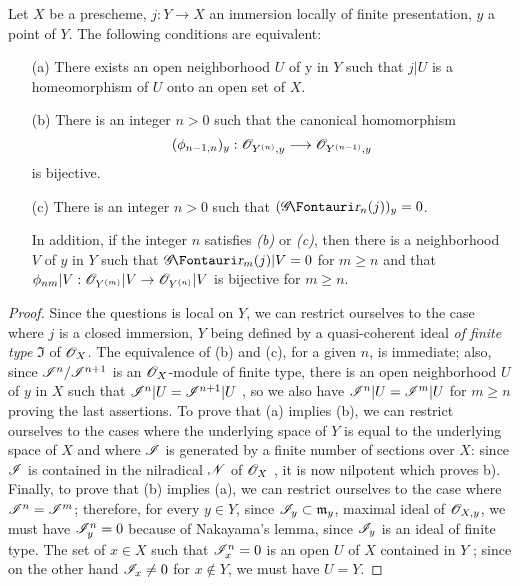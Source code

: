\begin{proposition}[16.1.9]
\label{IV.16.1.9}
Let $X$ be a prescheme, $j: Y \to X$ an immersion locally of finite presentation, $y$ a point of $Y$. The following conditions are equivalent:
\begin{enumerate}
  \item[(a)] There exists an open neighborhood $U$ of y in $Y$ such that $j|U$ is a homeomorphism of $U$ onto an open set of $X$.
  \item[(b)] There is an integer $n>0$ such that the canonical homomorphism
  \[
    (\phi_{n-1,n})_y: \sh{O}_{Y^{(n)},y} \to \sh{O}_{Y^{(n-1)},y}
  \]
  is bijective.
  \item[(c)] There is an integer $n>0$ such that $(\shGr_n(j))_y = 0$.
  
  In addition, if the integer $n$ satisfies \emph{(b)} or \emph{(c)}, then there is a neighborhood $V$ of $y$ in $Y$ such that $\shGr_m(j)|V = 0$ for $m \geq n$ and that $\phi_{nm}|V: \sh{O}_{Y^{(m)}}|V \to \sh{O}_{Y^{(n)}}|V$ is bijective for $m \geq n$. 
\end{enumerate}
\end{proposition}

\begin{proof}
Since the questions is local on $Y$, we can restrict ourselves to the case where $j$ is a closed immersion, $Y$ being defined by a quasi-coherent ideal \emph{of finite type} $\mathfrak{I}$ of $\mathscr{O}_X$.
The equivalence of (b) and (c), for a given $n$, is immediate;
also, since $\mathscr{I}^n/\mathscr{I}^{n+1}$ is an $\mathscr{O}_X$-module of finite type, there is an open neighborhood $U$ of $y$ in $X$ such that $\mathscr{I}^n|U = \mathscr{I}^{n+1}|U$ , so we also have $\mathscr{I}^n|U = \mathscr{I}^m|U$ for $m \geq n$ proving the last assertions.
To prove that (a) implies (b), we can restrict ourselves to the cases where the underlying space of $Y$ is equal to the underlying space of $X$ and where $\mathscr{I}$ is generated by a finite number of sections over $X$:
since $\mathscr{I}$ is contained in the nilradical $\mathscr{N}$ of $\mathscr{O}_X$ , it is now nilpotent which proves b).
Finally, to prove that (b) implies (a), we can restrict ourselves to the case where $\mathscr{I}^n = \mathscr{I}^m$; 
therefore, for every $y \in Y$, since $\mathscr{I}_y \subset \mathfrak{m}_y$, maximal ideal of $\mathscr{O}_{X,y}$, we must have $\mathscr{I}^n_y = 0$ because of Nakayama's lemma, since $\mathscr{I}_y$ is an ideal of finite type.
The set of $x \in X$ such that $\mathscr{I}^n_x = 0$ is an open $U$ of $X$ contained in $Y$ ;
since on the other hand $\mathscr{I}_x \neq 0$ for $x \notin Y$, we must have $U = Y$.
\end{proof}

